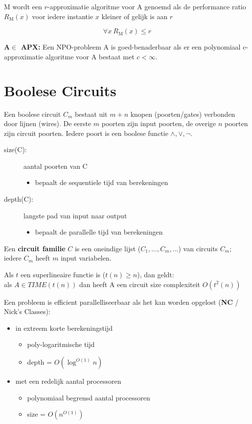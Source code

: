 \documentclass[]{article}
\begin{document}
\medskip

M wordt een $r$-approximatie algoritme voor A genoemd als de performance ratio $R_\text{M}(x)$ voor iedere instantie $x$ kleiner of gelijk is aan $r$

\[
\forall x ~ R_\text{M}(x) \leq r
\]

\medskip

\textbf{$\mathbf{A} \in$ APX:} Een NPO-probleem A is goed-benaderbaar als er een polynomiaal c-approximatie algoritme voor A bestaat met $c < \infty$.

\section*{Boolese Circuits}

Een boolese circuit $C_m$ bestaat uit $m+n$ knopen (poorten/gates) verbonden door lijnen (wires). De eerste $m$ poorten zijn input poorten, de overige $n$ poorten zijn circuit poorten. Iedere poort is een boolese functie $\wedge, \vee, \neg$.

\begin{description}
\item[size(C):] aantal poorten van C
\begin{itemize}
\item bepaalt de sequentiele tijd van berekeningen
\end{itemize}
\item[depth(C):] langste pad van input naar output
\begin{itemize}
\item bepaalt de parallelle tijd van berekeningen
\end{itemize}
\end{description}

Een \textbf{circuit familie} $C$ is een oneindige lijst ($C_1, ..., C_m, ...$) van circuits $C_m$; iedere $C_m$ heeft $m$ input variabelen.

\medskip

Als $t$ een superlineaire functie is ($t(n) \geq n$), dan geldt: \\
\hspace*{1cm} als $A \in TIME(t(n))$ dan heeft A een circuit size complexiteit $O(t^2(n))$

\medskip

Een probleem is efficient parallelliseerbaar als het kan worden opgelost (\textbf{NC} / Nick's Classes):

\begin{itemize}
\item in extreem korte berekeningstijd
\begin{itemize}
\item poly-logaritmische tijd
\item depth = $O(\log^{O(1)}n)$
\end{itemize}
\item met een redelijk aantal processoren
\begin{itemize}
\item polynomiaal begrensd aantal processoren
\item size = $O(n^{O(1)})$
\end{itemize}
\end{itemize}
\end{document}
